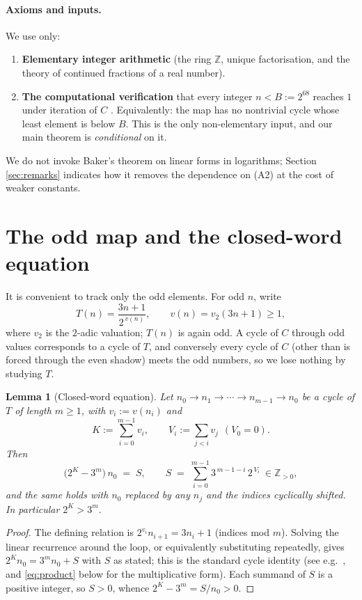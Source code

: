 \documentclass[11pt]{article}
\newtheorem{lemma}{Lemma}
\theoremstyle{definition}
\newcommand{\Z}{\mathbb{Z}}
\begin{document}
\paragraph{Axioms and inputs.} We use only:
\begin{enumerate}[label=(A\arabic*),leftmargin=*]
\item \textbf{Elementary integer arithmetic} (the ring $\Z$, unique
factorisation, and the theory of continued fractions of a real number).
\item \textbf{The computational verification} that every integer $n < B := 2^{68}$
reaches $1$ under iteration of $C$ \cite{barina,oliveira}. Equivalently: the map
has no nontrivial cycle whose least element is below $B$. This is the only
non-elementary input, and our main theorem is \emph{conditional} on it.
\end{enumerate}
We do not invoke Baker's theorem on linear forms in logarithms; Section
\ref{sec:remarks} indicates how it removes the dependence on (A2) at the cost of
weaker constants.

\section{The odd map and the closed-word equation}\label{sec:equation}

It is convenient to track only the odd elements. For odd $n$, write
\[
  T(n) = \frac{3n+1}{2^{\,v(n)}}, \qquad v(n) = v_2(3n+1) \ge 1,
\]
where $v_2$ is the $2$-adic valuation; $T(n)$ is again odd. A cycle of $C$ through
odd values corresponds to a cycle of $T$, and conversely every cycle of $C$
(other than is forced through the even shadow) meets the odd numbers, so we lose
nothing by studying $T$.

\begin{lemma}[Closed-word equation]\label{lem:equation}
Let $n_0 \to n_1 \to \cdots \to n_{m-1} \to n_0$ be a cycle of $T$ of length
$m \ge 1$, with $v_i := v(n_i)$ and
\[
  K := \sum_{i=0}^{m-1} v_i, \qquad V_i := \sum_{j<i} v_j \ \ (V_0 = 0).
\]
Then
\begin{equation}\label{eq:cycle}
  \bigl(2^{K} - 3^{m}\bigr)\, n_0 \;=\; S, \qquad
  S \;=\; \sum_{i=0}^{m-1} 3^{\,m-1-i}\, 2^{\,V_i} \ \in \Z_{>0},
\end{equation}
and the same holds with $n_0$ replaced by any $n_j$ and the indices cyclically
shifted. In particular $2^{K} > 3^{m}$.
\end{lemma}

\begin{proof}
The defining relation is $2^{v_i} n_{i+1} = 3 n_i + 1$ (indices mod $m$).
Solving the linear recurrence around the loop, or equivalently substituting
repeatedly, gives $2^{K} n_0 = 3^{m} n_0 + S$ with $S$ as stated; this is the
standard cycle identity (see e.g.\ \cite{lagarias}, and \eqref{eq:product} below
for the multiplicative form). Each summand of $S$ is a positive integer, so
$S>0$, whence $2^K - 3^m = S/n_0 > 0$.
\end{proof}
\end{document}
